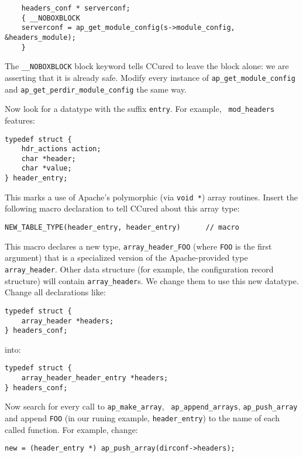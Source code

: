 \documentclass{book}
\begin{document}
\begin{verbatim}
    headers_conf * serverconf;
    { __NOBOXBLOCK
    serverconf = ap_get_module_config(s->module_config, &headers_module);
    } 
\end{verbatim}

The {\tt \_\_NOBOXBLOCK} block keyword tells CCured to leave the block
alone: we are asserting that it is already safe. Modify every instance of
{\tt ap\_get\_module\_config} and {\tt ap\_get\_perdir\_module\_config}
the same way. 

Now look for a datatype with the suffix {\tt entry}. For example, {\tt
mod\_headers} features:

\begin{verbatim}
typedef struct {
    hdr_actions action;
    char *header;
    char *value;
} header_entry;
\end{verbatim}

This marks a use of Apache's polymorphic (via {\tt void *}) array routines. 
Insert the following macro declaration to tell CCured about this array
type:

\begin{verbatim}
NEW_TABLE_TYPE(header_entry, header_entry)      // macro
\end{verbatim}

This macro declares a new type, {\tt array\_header\_FOO} (where {\tt FOO}
is the first argument) that is a specialized version of the Apache-provided
type {\tt array\_header}. Other data structure (for example, the
configuration record structure) will contain {\tt array\_header}s. We
change them to use this new datatype. Change all declarations like:

\begin{verbatim}
typedef struct {
    array_header *headers;
} headers_conf;
\end{verbatim}

into:

\begin{verbatim}
typedef struct {
    array_header_header_entry *headers;
} headers_conf;
\end{verbatim}

Now search for every call to {\tt ap\_make\_array}, {\tt
ap\_append\_arrays}, {\tt ap\_push\_array} and append {\tt FOO} (in our
runing example, {\tt header\_entry}) to the name of each called function.
For example, change: 

\begin{verbatim}
new = (header_entry *) ap_push_array(dirconf->headers);
\end{verbatim}
\end{document}
